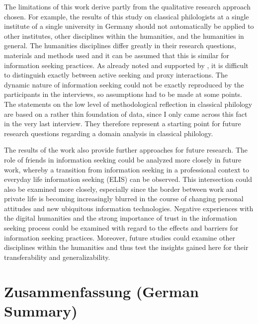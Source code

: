 \documentclass[12pt, a4paper, titlepage, oneside, abstract=true, toc=listof, toc=bibliography, BCOR=1cm]{scrreprt}
\begin{document}
{The limitations of this work derive partly from the qualitative research approach chosen. For example, the results of this study on classical philologists at a single institute of a single university in Germany should not automatically be applied to other institutes, other disciplines within the humanities, and the humanities in general. The humanities disciplines differ greatly in their research questions, materials and methods used \citep{Loennqvist2007} and it can be assumed that this is similar for information seeking practices. As already noted and supported by \citet{McKenzie2003a}, it is difficult to distinguish exactly between active seeking and proxy interactions. The dynamic nature of information seeking \citep{Savolainen2019} could not be exactly reproduced by the participants in the interviews, so assumptions had to be made at some points. The statements on the low level of methodological reflection in classical philology are based on a rather thin foundation of data, since I only came across this fact in the very last interview. They therefore represent a starting point for future research questions regarding a domain analysis in classical philology.

The results of the work also provide further approaches for future research. The role of friends in information seeking could be analyzed more closely in future work, whereby a transition from information seeking in a professional context to everyday life information seeking (ELIS) can be observed. This intersection could also be examined more closely, especially since the border between work and private life is becoming increasingly blurred in the course of changing personal attitudes and new ubiquitous information technologies. Negative experiences with the digital humanities and the strong importance of trust in the information seeking process could be examined with regard to the effects and barriers for information seeking practices. Moreover, future studies could examine other disciplines within the humanities and thus test the insights gained here for their transferability and generalizability. 

\chapter{Zusammenfassung (German Summary)}

}
\end{document}
